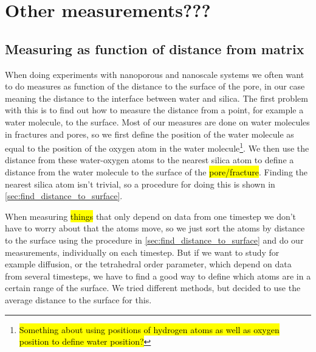 \chapter{Other measurements???}

\section{Measuring as function of distance from matrix}

When doing experiments with nanoporous and nanoscale systems we often want to do measures as function of the distance to the surface of the pore, in our case meaning the distance to the interface between water and silica. The first problem with this is to find out how to measure the distance from a point, for example a water molecule, to the surface. Most of our measures are done on water molecules in fractures and pores, so we first define the position of the water molecule as equal to the position of the oxygen atom in the water molecule\footnote{\hl{Something about using positions of hydrogen atoms as well as oxygen position to define water position?}}. We then use the distance from these water-oxygen atoms to the nearest silica atom to define a distance from the water molecule to the surface of the \hl{pore/fracture}. Finding the nearest silica atom isn't trivial, so a procedure for doing this is shown in \cref{sec:find_distance_to_surface}.

When measuring \hl{things} that only depend on data from one timestep we don't have to worry about that the atoms move, so we just sort the atoms by distance to the surface using the procedure in \cref{sec:find_distance_to_surface} and do our measurements, individually on each timestep. But if we want to study for example diffusion, or the tetrahedral order parameter, which depend on data from several timesteps, we have to find a good way to define which atoms are in a certain range of the surface. We tried different methods, but decided to use the average distance to the surface for this.

